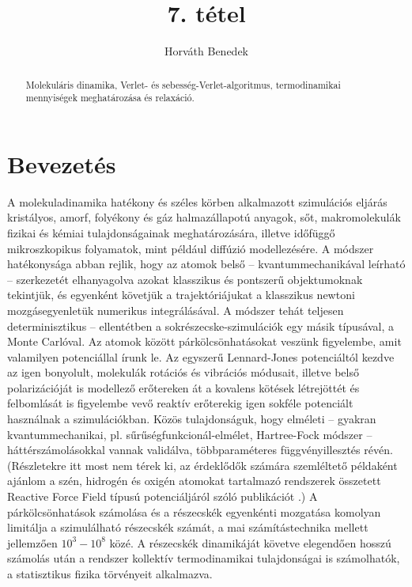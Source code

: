 \documentclass[12pt]{article}
\theoremstyle{plain}
\begin{document}
\title{7. tétel}
\author{Horváth Benedek}

\maketitle


\newpage
\begin{abstract}
    Molekuláris dinamika, Verlet- és sebesség-Verlet-algoritmus, termodinamikai mennyiségek meghatározása és relaxáció.
\end{abstract}


\section{Bevezetés}

A molekuladinamika hatékony és széles körben alkalmazott szimulációs eljárás kristályos, amorf, folyékony és gáz halmazállapotú anyagok, sőt, makromolekulák fizikai és kémiai tulajdonságainak meghatározására, illetve időfüggő mikroszkopikus folyamatok, mint például diffúzió modellezésére. A módszer hatékonysága abban rejlik, hogy az atomok belső -- kvantummechanikával leírható -- szerkezetét elhanyagolva azokat klasszikus és pontszerű objektumoknak tekintjük, és egyenként követjük a trajektóriájukat a klasszikus newtoni mozgásegyenletük numerikus integrálásával. A módszer tehát teljesen determinisztikus -- ellentétben a sokrészecske-szimulációk egy másik típusával, a Monte Carlóval. Az atomok között párkölcsönhatásokat veszünk figyelembe, amit valamilyen potenciállal írunk le. Az egyszerű Lennard-Jones potenciáltól kezdve az igen bonyolult, molekulák rotációs és vibrációs módusait, illetve belső polarizációját is modellező erőtereken át a kovalens kötések létrejöttét és felbomlását is figyelembe vevő reaktív erőterekig igen sokféle potenciált használnak a szimulációkban. Közös tulajdonságuk, hogy elméleti -- gyakran kvantummechanikai, pl. sűrűségfunkcionál-elmélet, Hartree-Fock módszer -- háttérszámolásokkal vannak validálva, többparaméteres függvényillesztés révén. (Részletekre itt most nem térek ki, az érdeklődők számára szemléltető példaként ajánlom a szén, hidrogén és oxigén atomokat tartalmazó rendszerek összetett Reactive Force Field típusú potenciáljáról szóló publikációt \cite{KimberlyChenoweth2008}.) A párkölcsönhatások számolása és a részecskék egyenkénti mozgatása komolyan limitálja a szimulálható részecskék számát, a mai számítástechnika mellett jellemzően $10^3-10^8$ közé. A részecskék dinamikáját követve elegendően hosszú számolás után a rendszer kollektív termodinamikai tulajdonságai is számolhatók, a statisztikus fizika törvényeit alkalmazva.
\end{document}
